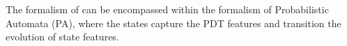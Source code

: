 The formalism of  can be encompassed within the formalism of Probabilistic Automata (PA), where the states capture the PDT features and transition the evolution of state features.


 





   

   
  
              

